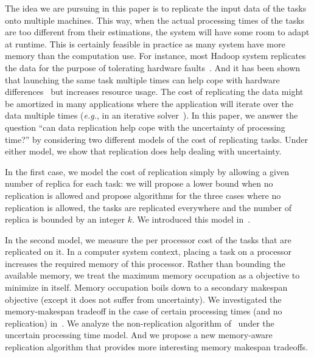 \documentclass[twocolumn]{svjour3}
\begin{document}
The idea we are pursuing in this paper is to replicate the input data
of the tasks onto multiple machines. This way, when the actual
processing times of the tasks are too different from their
estimations, the system will have some room to adapt at runtime. This
is certainly feasible in practice as many system have more memory than
the computation use. For instance, most Hadoop system replicates the
data for the purpose of tolerating hardware
faults~\cite{White:2009:HDG:1717298}. And it has been shown that
launching the same task multiple times can help cope with hardware
differences~\cite{DBLP:journals/corr/WangJW14} but increases resource
usage. The cost of replicating the data might be amortized in many
applications where the application will iterate over the data multiple
times ({\em e.g.}, in an iterative
solver~\cite{Zhou12-P2S2,Zhou12-Cluster}). In this paper, we answer
the question ``can data replication help cope with the uncertainty of
processing time?'' by considering two different models of the cost of
replicating tasks. Under either model, we show that replication does
help dealing with uncertainty.

In the first case, we model the cost of replication simply by allowing
a given number of replica for each task: we will propose a lower bound
when no replication is allowed and propose algorithms for the three
cases where no replication is allowed, the tasks are replicated
everywhere and the number of replica is bounded by an integer
$k$. We introduced this model in~\cite{Chaubey2015}.

In the second model, we measure the per processor cost of the tasks
that are replicated on it. In a computer system context, placing a
task on a processor increases the required memory of this
processor. Rather than bounding the available memory, we treat the
maximum memory occupation as a objective to minimize in itself. Memory
occupation boils down to a secondary makespan objective (except it
does not suffer from uncertainty). We investigated the memory-makespan
tradeoff in the case of certain processing times (and no replication)
in~\cite{SDM2008}. We analyze the non-replication algorithm
of~\cite{SDM2008} under the uncertain processing time model. And we
propose a new memory-aware replication algorithm that provides more
interesting memory makespan tradeoffs.
\end{document}
